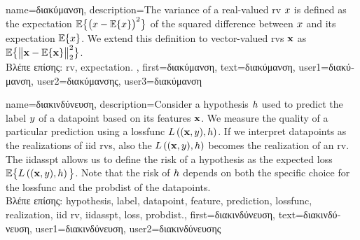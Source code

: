 {
	name={\foreignlanguage{greek}{διακύμανση}},
	description={The variance of a real-valued \gls{rv} $x$ is defined as the \gls{expectation} 
		$\mathbb{E}\big\{ \big( x - \mathbb{E}\{x \} \big)^{2} \big\}$ of the squared difference between $x$ 
		and its \gls{expectation} $\mathbb{E}\{x \}$. We extend this definition to vector-valued \gls{rv}s ${\bf x}$ 
		as $\mathbb{E}\big\{ \big\| {\bf x} - \mathbb{E}\{{\bf x} \} \big\|_{2}^{2} \big\}$.\\
		\foreignlanguage{greek}{Βλέπε επίσης:} \gls{rv}, \gls{expectation}.} ,
		first={\foreignlanguage{greek}{διακύμανση}},
		text={\foreignlanguage{greek}{διακύμανση}},
		user1={\foreignlanguage{greek}{διακύμανση}}, %
   		user2={\foreignlanguage{greek}{διακύμανσης}}, %
		user3={\foreignlanguage{greek}{διακύμανση}} %
}

{name={\foreignlanguage{greek}{διακινδύνευση}},
	description={Consider a \gls{hypothesis} $h$ used to predict the \gls{label} 
		$y$ of a \gls{datapoint} based on its \gls{feature}s ${\bf x}$. We measure 
		the quality of a particular \gls{prediction} using a \gls{lossfunc} $L\left(({\bf x},y),h \right)$. 
		If we interpret \gls{datapoint}s as the \gls{realization}s of \gls{iid} \gls{rv}s, 
		also the $L\left(({\bf x},y),h \right)$ becomes the \gls{realization} 
		of an \gls{rv}. The \gls{iidasspt} allows us to define the risk of a \gls{hypothesis} 
		as the expected \gls{loss} $\mathbb{E} \big\{L\left(({\bf x},y),h \right) \big\}$. 
		Note that the risk of $h$ depends on both the specific choice for the \gls{lossfunc} and the 
		\gls{probdist} of the \gls{datapoint}s.\\
		\foreignlanguage{greek}{Βλέπε επίσης:} \gls{hypothesis}, \gls{label}, \gls{datapoint}, \gls{feature}, \gls{prediction}, \gls{lossfunc}, \gls{realization}, \gls{iid} \gls{rv}, \gls{iidasspt}, \gls{loss}, \gls{probdist}.},
	first={\foreignlanguage{greek}{διακινδύνευση}},
	text={\foreignlanguage{greek}{διακινδύνευση}},
	user1={\foreignlanguage{greek}{διακινδύνευση}}, %
    	user2={\foreignlanguage{greek}{διακινδύνευσης}} %
}


